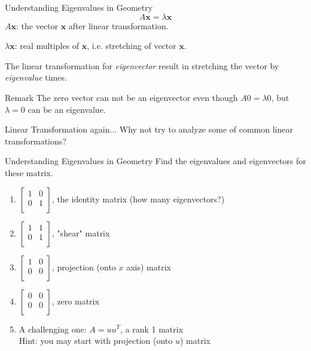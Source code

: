 \documentclass{beamer}
\begin{document}
\begin{frame}{Understanding Eigenvalues in Geometry}
\begin{equation*}
    A \mathbf{x}=\lambda \mathbf{x}
\end{equation*}
$A \mathbf{x}$: the vector $\mathbf{x}$ after linear transformation.

$\lambda \mathbf{x}$: real multiples of $\mathbf{x}$, i.e. stretching of vector $\mathbf{x}$.


The linear transformation for \textit{eigenvector} result in stretching the vector by \textit{eigenvalue} times.

\begin{block}{Remark}
    The zero vector can not be an eigenvector even though $A0=\lambda 0$, but $\lambda=0$ can be an eigenvalue.
\end{block}

Linear Transformation again... Why not try to analyze some of common linear transformations?
\end{frame}

\begin{frame}{Understanding Eigenvalues in Geometry}
Find the eigenvalues and eigenvectors for these matrix.

\begin{enumerate}
    \item $\left[ \begin{matrix}
        1&		0\\
        0&		1\\
    \end{matrix} \right]$, the identity matrix (how many eigenvectors?)
    \item $\left[ \begin{matrix}
        1&		1\\
        0&		1\\
    \end{matrix} \right]$, "shear" matrix
    \item $\left[ \begin{matrix}
        1&		0\\
        0&		0\\
    \end{matrix} \right]$, projection (onto $x$ axis) matrix
    \item $\left[ \begin{matrix}
        0&		0\\
        0&		0\\
    \end{matrix} \right]$, zero matrix
    \item A challenging one: $A=uu^T$, a rank 1 matrix\\
    Hint: you may start with projection (onto $u$) matrix
\end{enumerate}
\end{frame}
\end{document}
